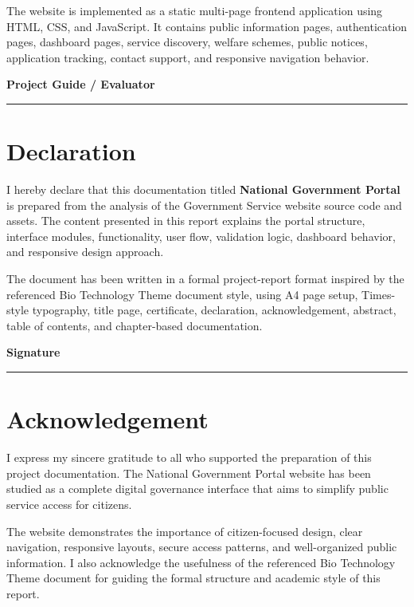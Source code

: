 \documentclass[12pt,a4paper]{report}
\begin{document}
The website is implemented as a static multi-page frontend application using HTML, CSS, and JavaScript. It contains public information pages, authentication pages, dashboard pages, service discovery, welfare schemes, public notices, application tracking, contact support, and responsive navigation behavior.

\vspace{0.8in}
\begin{flushright}
\textbf{Project Guide / Evaluator}\\
\vspace{0.6in}
\rule{2.6in}{0.4pt}
\end{flushright}

\chapter*{Declaration}
I hereby declare that this documentation titled \textbf{National Government Portal} is prepared from the analysis of the Government Service website source code and assets. The content presented in this report explains the portal structure, interface modules, functionality, user flow, validation logic, dashboard behavior, and responsive design approach.

The document has been written in a formal project-report format inspired by the referenced Bio Technology Theme document style, using A4 page setup, Times-style typography, title page, certificate, declaration, acknowledgement, abstract, table of contents, and chapter-based documentation.

\vspace{0.8in}
\begin{flushright}
\textbf{Signature}\\
\vspace{0.6in}
\rule{2.6in}{0.4pt}
\end{flushright}

\chapter*{Acknowledgement}
I express my sincere gratitude to all who supported the preparation of this project documentation. The National Government Portal website has been studied as a complete digital governance interface that aims to simplify public service access for citizens.

The website demonstrates the importance of citizen-focused design, clear navigation, responsive layouts, secure access patterns, and well-organized public information. I also acknowledge the usefulness of the referenced Bio Technology Theme document for guiding the formal structure and academic style of this report.
\end{document}
